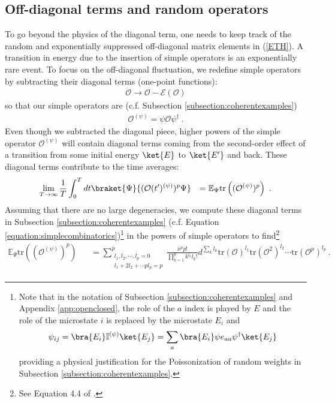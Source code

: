\documentclass[a4paper,11pt]{article}
\theoremstyle{definition}
\numberwithin{equation}{section}
\newcommand{\mO}{\mathcal{O}}
\newcommand{\lb}{\left(}
\newcommand{\rb}{\right)}
\begin{document}
\subsection{Off-diagonal terms and random operators}\label{subsec:ETH}
To go beyond the physics of the diagonal term, one needs to keep track of the random and exponentially suppressed off-diagonal matrix elements in (\ref{ETH}). A transition in energy due to the insertion of simple operators is an exponentially rare event. To focus on the off-diagonal fluctuation, we redefine simple operators by subtracting their diagonal terms (one-point functions):
\begin{eqnarray}
    \mO\to \mO-\mathcal{E}(\mO)
\end{eqnarray}
so that our simple operators are (c.f. Subsection \ref{subsection:coherentexamples})
\begin{eqnarray}
    \mO^{(\psi)}=\psi \mO \psi^\dagger\ .
\end{eqnarray}
Even though we subtracted the diagonal piece, higher powers of the simple operator $\mO^{(\psi)}$ will contain diagonal terms coming from the second-order effect of a transition from some initial energy $\ket{E}$ to $\ket{E'}$ and back. These diagonal terms contribute to the time averages:
\begin{eqnarray}
     \lim_{T\to \infty}\frac{1}{T}\int_0^T dt\braket{\Psi}{(\mO(t')^{(\psi)})^p\Psi}&&=\mathbb{E}_\Psi\text{tr}\lb (\mO^{(\psi)})^p\rb\ .
\end{eqnarray}
Assuming that there are no large degeneracies, we compute these diagonal terms in Subsection \ref{subsection:coherentexamples} (c.f. Equation \ref{equation:simplecombinatorics})\footnote{Note that in the notation of Subsection \ref{subsection:coherentexamples} and Appendix \ref{app:openclosed}, the role of the $a$ index is played by $E$ and the role of the microstate $i$ is replaced by the microstate $E_i$ and 
\begin{eqnarray}
\psi_{ij}=\bra{E_i}\mathbb{I}^{(\psi)}\ket{E_j}=\sum_a\bra{E_i}\psi e_{aa}\psi^\dagger\ket{E_j}
\end{eqnarray}
providing a physical justification for the Poissonization of random weights in Subsection \ref{subsection:coherentexamples}.
} in the powers of simple operators to find\footnote{See Equation 4.4 of \cite{srednicki1999approach}.}
\begin{eqnarray}
\mathbb{E}_\Psi\text{tr}\lb (\mO^{(\psi)})^p\rb&&= \sum_{\substack{l_1,l_2,\cdots, l_p=0\\
    l_1+2l_2+\cdots pl_p=p}}^p    \frac{x^p p!}{\prod_{k=1}^p k^{l_k}l_k!}  d^{\sum_k l_k} \text{tr}(\mO)^{l_1}\text{tr}(\mO^2)^{l_2}\cdots \text{tr}(\mO^p)^{l_p}\ .
\end{eqnarray}
\end{document}
